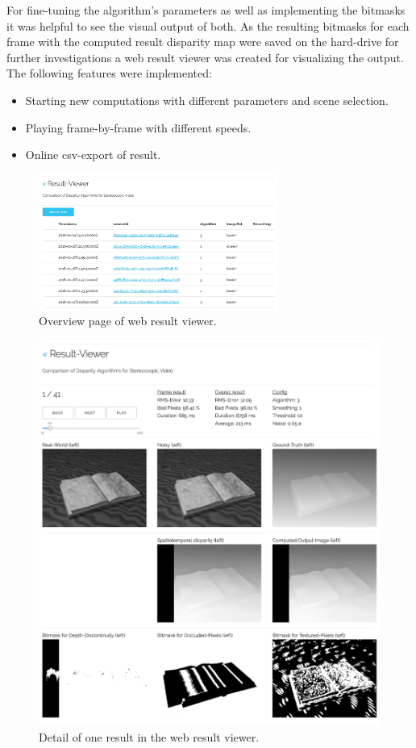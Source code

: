 For fine-tuning the algorithm's parameters as well as implementing the bitmasks it was helpful to see the visual output of both.
As the resulting bitmasks for each frame with the computed result disparity map were saved on the hard-drive for further investigations a web result viewer was created for visualizing the output.
The following features were implemented:
\begin{itemize}
  \item Starting new computations with different parameters and scene selection.
  \item Playing frame-by-frame with different speeds.
  \item Online csv-export of result.
\end{itemize}

\begin{figure}[p!]
  \centering
  \includegraphics[angle=90,width=0.7\textwidth]{src/images/result-viewer-overview.png}
  \caption{Overview page of web result viewer.}
  \label{fig:web-overview}
\end{figure}

\begin{figure}[p!]
  \centering
  \includegraphics[angle=90,width=1.0\textwidth]{src/images/result-viewer-detail.png}
  \caption{Detail of one result in the web result viewer.}
  \label{fig:web-detail}
\end{figure}

